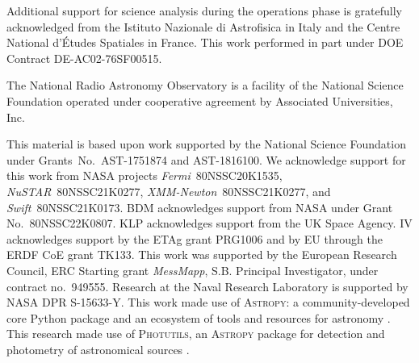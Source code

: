 \documentclass[a4paper,fleqn,usenatbib]{mnras}
\begin{document}
Additional support for science analysis during the operations phase is gratefully
acknowledged from the Istituto Nazionale di Astrofisica in Italy and the Centre
National d'\'Etudes Spatiales in France. This work performed in part under DOE
Contract DE-AC02-76SF00515.

The National Radio Astronomy Observatory is a facility of the National Science Foundation operated under cooperative agreement by Associated Universities, Inc.

This material is based upon work supported by the National Science Foundation under Grants~No.~AST-1751874 and AST-1816100. 
We acknowledge support for this work from NASA projects 
{\em Fermi}~80NSSC20K1535,
{\em NuSTAR}~80NSSC21K0277, %
{\em XMM-Newton}~80NSSC21K0277, %
and {\em Swift}~80NSSC21K0173. %
%
BDM acknowledges support from NASA under Grant No.~80NSSC22K0807.
%
KLP acknowledges support from the UK Space Agency.
IV acknowledges support by the ETAg grant PRG1006 and by EU through the ERDF CoE grant TK133.
This work was supported by the European Research Council, ERC Starting grant \emph{MessMapp}, S.B. Principal Investigator, under contract no.~949555.
Research at the Naval Research Laboratory is supported by NASA DPR S-15633-Y.
This work made use of \textsc{Astropy}: %
a community-developed core Python package 
and an ecosystem of tools and resources for astronomy \citep{2013A&A...558A..33A,2018AJ....156..123A,2022ApJ...935..167A}. 
This research made use of \textsc{Photutils}, an \textsc{Astropy} package for 
detection and photometry of astronomical sources \citep{larry_bradley_2022_6825092}. 
%
%
%
%
%


%


%
%
%
%
%
%

\bsp %
\label{lastpage}
\end{document}
